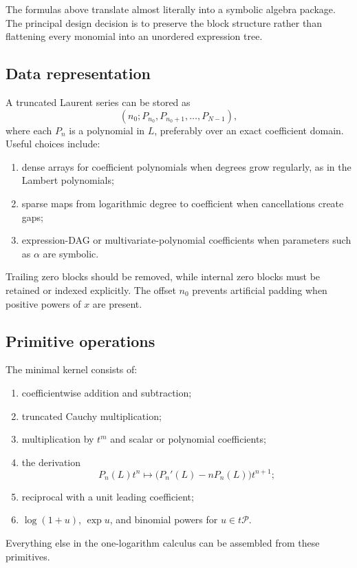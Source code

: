\documentclass[11pt]{article}
\theoremstyle{pltheorem}
\newcommand{\PL}{\mathscr P}
\begin{document}
The formulas above translate almost literally into a symbolic algebra package.  The principal design decision is to preserve the block structure rather than flattening every monomial into an unordered expression tree.

\subsection{Data representation}

A truncated Laurent series can be stored as
\begin{equation}\label{eq:data-structure}
 (n_0;P_{n_0},P_{n_0+1},\ldots,P_{N-1}),
\end{equation}
where each \(P_n\) is a polynomial in \(L\), preferably over an exact coefficient domain.  Useful choices include:
\begin{enumerate}
\item dense arrays for coefficient polynomials when degrees grow regularly, as in the Lambert polynomials;
\item sparse maps from logarithmic degree to coefficient when cancellations create gaps;
\item expression-DAG or multivariate-polynomial coefficients when parameters such as \(\alpha\) are symbolic.
\end{enumerate}
Trailing zero blocks should be removed, while internal zero blocks must be retained or indexed explicitly.  The offset \(n_0\) prevents artificial padding when positive powers of \(x\) are present.

\subsection{Primitive operations}

The minimal kernel consists of:
\begin{enumerate}
\item coefficientwise addition and subtraction;
\item truncated Cauchy multiplication;
\item multiplication by \(t^m\) and scalar or polynomial coefficients;
\item the derivation
\begin{equation}\label{eq:implementation-D}
 P_n(L)t^n\longmapsto\bigl(P_n'(L)-nP_n(L)\bigr)t^{n+1};
\end{equation}
\item reciprocal with a unit leading coefficient;
\item \(\log(1+u)\), \(\exp u\), and binomial powers for \(u\in t\PL\).
\end{enumerate}
Everything else in the one-logarithm calculus can be assembled from these primitives.
\end{document}
